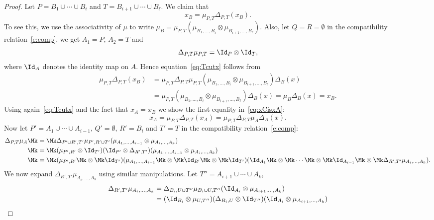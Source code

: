 \begin{proof}
Let $P=B_1\cup\cdots\cup B_i$ and $T=B_{i+1}\cup\cdots\cup B_\ell$.
We claim that
\begin{equation}\label{eq:Tcutx}
 x_B=\mu_{P,T}\Delta_{P,T}(x_B).
\end{equation}
To see this, we use the associativity of $\mu$ to write $\mu_B=\mu_{P,T}(\mu_{B_1,\ldots,B_i}\otimes\mu_{B_{i+1},\ldots,B_\ell})$. Also, let $Q=R=\emptyset$ in the compatibility relation~\eqref{e:comp}, we get $A_1=P$, $A_2=T$ and 
 $$\Delta_{P,T}\mu_{P,T}=\Id_P\otimes \Id_T,$$
where $\Id_A$ denotes the identity map on $A$. Hence equation~\eqref{eq:Tcutx} follows from
 $$
 \begin{aligned}
 \mu_{P,T}\Delta_{P,T}(x_B)&=\mu_{P,T}\Delta_{P,T}\mu_{P,T}(\mu_{B_1,\ldots,B_i}\otimes\mu_{B_{i+1},\ldots,B_\ell})\Delta_B(x)\\
 &=\mu_{P,T}(\mu_{B_1,\ldots,B_i}\otimes\mu_{B_{i+1},\ldots,B_\ell})\Delta_B(x)=\mu_B\Delta_B(x)=x_B.
 \end{aligned} 
 $$
Using again~\eqref{eq:Tcutx} and the fact that $x_A=x_B$ we show the first equality in~\eqref{eq:xCisxA}:
\begin{equation}\label{eq:TcutS}
 x_A=\mu_{P,T}\Delta_{P,T}(x_A)=\mu_{P,T}\Delta_{P,T}\mu_A\Delta_A(x).
\end{equation}
 Now let $P'=A_1\cup\cdots\cup A_{i-1}$, $Q'=\emptyset$, $R'=B_i $ and $T'=T$ in the compatibility relation~\eqref{e:comp}:
 $$
 \begin{aligned}
 \Delta_{P,T}\mu_A &\Mk= \Mk\Delta_{P'\cup R',T'}\mu_{P',R'\cup T'}(\mu_{A_1,\ldots,A_{i-1}}\otimes \mu_{A_i,\ldots,A_k})\\
 &\Mk=\Mk(\mu_{P',R'}\otimes \Id_{T'})(\Id_{P'}\otimes\Delta_{R',T'})(\mu_{A_1,\ldots,A_{i-1}}\otimes \mu_{A_i,\ldots,A_k})\\
 &\Mk=\Mk(\mu_{P',R'}\Mk\otimes \Mk\Id_{T'})(\mu_{A_1,\ldots,A_{i-1}}\Mk\otimes\Mk\Id_{R'}\Mk\otimes\Mk\Id_{T'})
 (\Id_{A_{1}} \Mk\otimes\Mk\cdots\Mk\otimes \Mk\Id_{A_{i-1}}\Mk\otimes\Mk\Delta_{R',T'}\mu_{A_i,\ldots,A_k}).\\
 \end{aligned}
 $$
 We now expand $\Delta_{R',T'}\mu_{A_i,\ldots,A_k}$ using similar manipulations. Let $T''=A_{i+1}\cup\cdots\cup A_k$,
 $$
 \begin{aligned}
 \Delta_{R',T'}\mu_{A_i,\ldots,A_k} &= \Delta_{B_i , U\cup T''}\mu_{B_i\cup U,T''}(\Id_{A_i}\otimes \mu_{A_{i+1},\ldots,A_k})\\
 &=(\Id_{B_i}\otimes \mu_{U,T''})(\Delta_{B_i,U}\otimes\Id_{T''})(\Id_{A_i}\otimes \mu_{A_{i+1},\ldots,A_k})\\

\end{aligned}$$
\end{proof}
